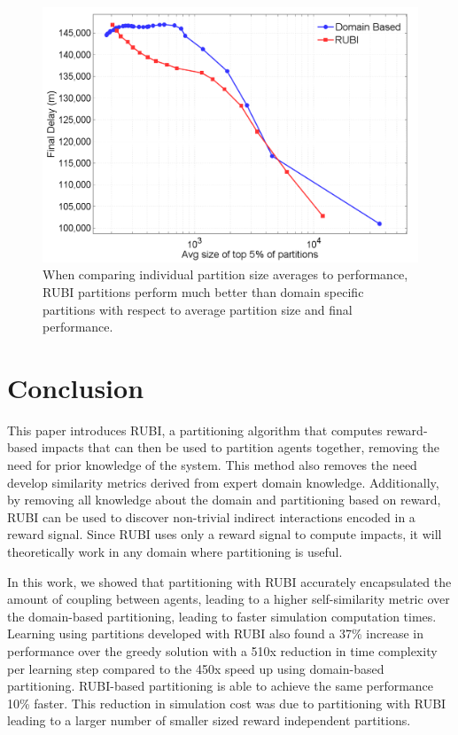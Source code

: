 \documentclass{aamas2014}
\begin{document}
\begin{figure}
\centering
\includegraphics[width=1.0\columnwidth]{ATFMPPerformancevsAvgSize}
\caption{When comparing individual partition size averages to performance, RUBI partitions perform much better than domain specific partitions with respect to average partition size and final performance.}
\label{ATFMPPerformancevsAvgSize}
\end{figure}


\section{Conclusion}
This paper introduces RUBI, a partitioning algorithm that computes reward-based impacts that can then be used to partition agents together, removing the need for prior knowledge of the system. This method also removes the need develop similarity metrics derived from expert domain knowledge. Additionally, by removing all knowledge about the domain and partitioning based on reward, RUBI can be used to discover non-trivial indirect interactions encoded in a reward signal. Since RUBI uses only a reward signal to compute impacts, it will theoretically work in any domain where partitioning is useful.

In this work, we showed that partitioning with RUBI accurately encapsulated the amount of coupling between agents, leading to a higher self-similarity metric over the domain-based partitioning, leading to faster simulation computation times. Learning using partitions developed with RUBI also found a 37\% increase in performance over the greedy solution with a 510x reduction in time complexity per learning step  compared to the 450x speed up using domain-based partitioning. RUBI-based partitioning is able to achieve the same performance 10\% faster. This reduction in simulation cost was due to partitioning with RUBI leading to a larger number of smaller sized reward independent partitions.
\end{document}
